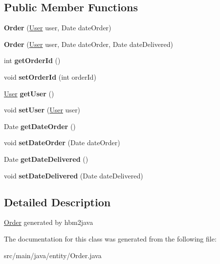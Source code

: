 \subsection*{Public Member Functions}
\begin{DoxyCompactItemize}
\item 
\mbox{\label{classentity_1_1_order_a29eb9dead0b1577bd57bc3a5db15f981}} 
{\bfseries Order} (\mbox{\hyperlink{classentity_1_1_user}{User}} user, Date date\+Order)
\item 
\mbox{\label{classentity_1_1_order_a5180af95fecce83f0416706550fed72d}} 
{\bfseries Order} (\mbox{\hyperlink{classentity_1_1_user}{User}} user, Date date\+Order, Date date\+Delivered)
\item 
\mbox{\label{classentity_1_1_order_a4561af92f26502434e496c32164ea1ff}} 
int {\bfseries get\+Order\+Id} ()
\item 
\mbox{\label{classentity_1_1_order_a780f89a2c6102d22cc7c076b7a038c8f}} 
void {\bfseries set\+Order\+Id} (int order\+Id)
\item 
\mbox{\label{classentity_1_1_order_a5262114e6d86f0826384b5aebaa04856}} 
\mbox{\hyperlink{classentity_1_1_user}{User}} {\bfseries get\+User} ()
\item 
\mbox{\label{classentity_1_1_order_ad8de4f52695d2a9230e9bdb0aa42decb}} 
void {\bfseries set\+User} (\mbox{\hyperlink{classentity_1_1_user}{User}} user)
\item 
\mbox{\label{classentity_1_1_order_a69a26d54af50e17b399f6af80433b569}} 
Date {\bfseries get\+Date\+Order} ()
\item 
\mbox{\label{classentity_1_1_order_a0c2fee67a9b341a27e83b875534bf9ea}} 
void {\bfseries set\+Date\+Order} (Date date\+Order)
\item 
\mbox{\label{classentity_1_1_order_a949fad3af9e1747db36124d934ed6413}} 
Date {\bfseries get\+Date\+Delivered} ()
\item 
\mbox{\label{classentity_1_1_order_a36942ca27b3ac8f905319ba13986ff19}} 
void {\bfseries set\+Date\+Delivered} (Date date\+Delivered)
\end{DoxyCompactItemize}


\subsection{Detailed Description}
\mbox{\hyperlink{classentity_1_1_order}{Order}} generated by hbm2java 

The documentation for this class was generated from the following file\+:\begin{DoxyCompactItemize}
\item 
src/main/java/entity/Order.\+java\end{DoxyCompactItemize}
